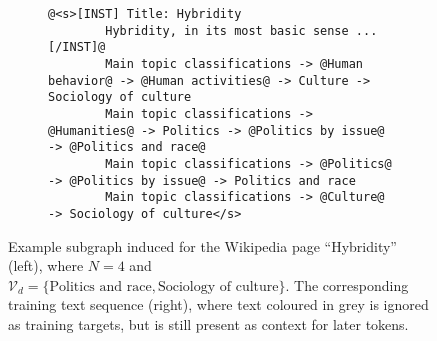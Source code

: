 \begin{figure}[t]
    \centering
    \begin{subfigure}[c]{0.443\textwidth}
        \centering
    \end{subfigure}%
    \hfill
    \begin{adjustbox}{varwidth=\linewidth,fbox}
        \begin{subfigure}[c]{0.48\textwidth}
            \centering
            \begin{lstlisting}[gobble=8,style=prompt]
        @<s>[INST] Title: Hybridity
        Hybridity, in its most basic sense ... [/INST]@
        Main topic classifications -> @Human behavior@ -> @Human activities@ -> Culture -> Sociology of culture
        Main topic classifications -> @Humanities@ -> Politics -> @Politics by issue@ -> @Politics and race@
        Main topic classifications -> @Politics@ -> @Politics by issue@ -> Politics and race
        Main topic classifications -> @Culture@ -> Sociology of culture</s>
        \end{lstlisting}
        \end{subfigure}
    \end{adjustbox}
    \caption{Example subgraph induced for the Wikipedia page ``Hybridity'' (left), where $N = 4$ and $\mathcal{V}_d = \{\text{Politics and race}, \text{Sociology of culture}\}$. The corresponding training text sequence (right), where text coloured in grey is ignored as training targets, but is still present as context for later tokens.}
    \label{fig:prompt-example}
\end{figure}